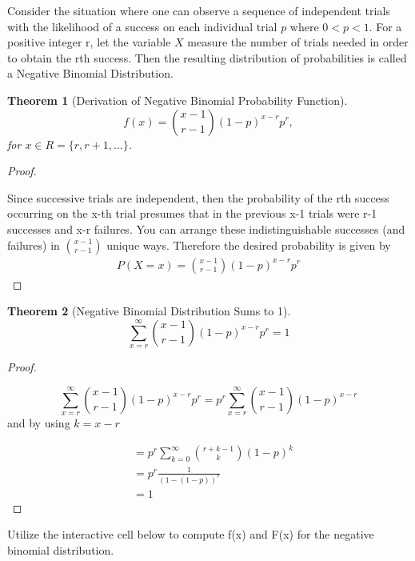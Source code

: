 \documentclass[10pt,]{book}
\theoremstyle{plain}
\newtheorem{theorem}{Theorem}[section]
\theoremstyle{definition}
\theoremstyle{definition}
\theoremstyle{definition}
\numberwithin{equation}{section}
\newcommand{\lt}{ < }
\begin{document}
\par
Consider the situation where one can observe a sequence  of independent trials with the likelihood of a success on each individual trial \(p\) where 
	\( 0 \lt p \lt 1 \).  
	For a positive integer r, let the variable \(X\) measure the number of trials needed in order to obtain the rth success. Then the resulting distribution of probabilities is called a Negative Binomial Distribution.%
\begin{theorem}[{Derivation of Negative Binomial Probability Function}]\label{theorem-43}
\begin{equation*}f(x) = \binom{x - 1}{r-1}(1-p)^{x-r}p^r,\end{equation*}
	for \(x \in R = \{r, r+1, ... \}\).
	\end{theorem}
\begin{proof}\hypertarget{proof-43}{}
 Since successive trials are independent, then the probability of the rth success occurring on the x-th trial presumes that in the previous x-1 trials were r-1 successes and x-r failures. You can arrange these indistinguishable successes (and failures) in \(\binom{x-1}{r-1}\) unique ways. Therefore the desired probability is given by 
			\begin{gather*}
P(X=x) = \binom{x - 1}{r-1}(1-p)^{x-r}p^r
\end{gather*}
\end{proof}
\begin{theorem}[{Negative Binomial Distribution Sums to 1}]\label{theorem-44}
\begin{equation*}\sum_{x=r}^{\infty} {\binom{x - 1}{r-1}(1-p)^{x-r}p^r} = 1\end{equation*}\end{theorem}
\begin{proof}\hypertarget{proof-44}{}

		\begin{equation*}\sum_{x=r}^{\infty} {\binom{x - 1}{r-1}(1-p)^{x-r}p^r} = p^r \sum_{x=r}^{\infty} {\binom{x - 1}{r-1}(1-p)^{x-r}}\end{equation*}
		and by using \(k = x-r\)%

		\begin{align*}
 & = p^r \sum_{k=0}^{\infty} {\binom{r + k - 1}{k}(1-p)^k}\\
 & = p^r \frac{1}{(1-(1-p))^r}\\
 & = 1
\end{align*}
\end{proof}
\par
Utilize the interactive cell below to compute f(x) and F(x) for the negative binomial distribution.
\end{document}
